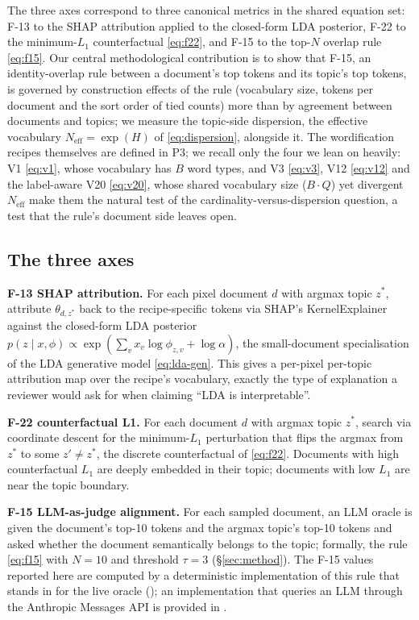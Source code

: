 \documentclass[journal,a4paper,10pt]{IEEEtran}
\begin{document}
The three axes correspond to three canonical metrics in the shared
equation set: F-13 to the SHAP attribution applied to the closed-form
LDA posterior, F-22 to the minimum-$L_1$ counterfactual
\eqref{eq:f22}, and F-15 to the top-$N$ overlap rule
\eqref{eq:f15}. Our central methodological contribution is to show
that F-15, an identity-overlap rule between a document's top tokens
and its topic's top tokens, is governed by construction effects of the
rule (vocabulary size, tokens per document and the sort order of tied
counts) more than by agreement between documents and topics; we
measure the topic-side dispersion, the effective vocabulary
$N_{\mathrm{eff}}=\exp(H)$ of \eqref{eq:dispersion}, alongside it. The
wordification recipes themselves are defined in P3; we recall only the
four we lean on heavily: V1 \eqref{eq:v1}, whose vocabulary has $B$
word types, and V3 \eqref{eq:v3}, V12 \eqref{eq:v12} and the
label-aware V20 \eqref{eq:v20}, whose shared vocabulary size
($B \cdot Q$) yet divergent $N_{\mathrm{eff}}$ make them the natural
test of the cardinality-versus-dispersion question, a test that the
rule's document side leaves open.

\subsection{The three axes}
\label{subsec:axes}

\textbf{F-13 SHAP attribution.} For each pixel document $d$ with
argmax topic $z^*$, attribute $\theta_{d,z^*}$ back to the
recipe-specific tokens via SHAP's KernelExplainer against the closed-form
LDA posterior $p(z \mid x, \phi) \propto \exp(\sum_v x_v \log \phi_{z,v} + \log \alpha)$,
the small-document specialisation of the LDA generative model
\eqref{eq:lda-gen}.
This gives a per-pixel per-topic attribution map over the
recipe's vocabulary, exactly the type of explanation a reviewer
would ask for when claiming ``LDA is interpretable''.

\textbf{F-22 counterfactual L1.} For each document $d$ with argmax
topic $z^*$, search via coordinate descent for the minimum-$L_1$
perturbation that flips the argmax from $z^*$ to some $z' \neq z^*$, the
discrete counterfactual of \eqref{eq:f22}.
Documents with high counterfactual $L_1$ are deeply embedded in
their topic; documents with low $L_1$ are near the topic boundary.

\textbf{F-15 LLM-as-judge alignment.} For each sampled document, an
LLM oracle is given the document's top-10 tokens and the argmax
topic's top-10 tokens and asked whether the document semantically
belongs to the topic; formally, the rule \eqref{eq:f15} with $N=10$
and threshold $\tau=3$ (\S\ref{sec:method}). The F-15 values
reported here are computed by a deterministic implementation of this
rule that stands in for the live oracle
(); an implementation that
queries an LLM through the Anthropic Messages API is provided in
.
\end{document}
